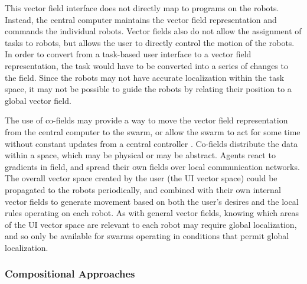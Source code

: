\documentclass[]{article}
\begin{document}
This vector field interface does not directly map to programs on the robots. 
Instead, the central computer maintains the vector field representation and commands the individual robots.
Vector fields also do not allow the assignment of tasks to robots, but allows the user to directly control the motion of the robots. 
In order to convert from a task-based user interface to a vector field representation, the task would have to be converted into a series of changes to the field.
Since the robots may not have accurate localization within the task space, it may not be possible to guide the robots by relating their position to a global vector field. 

The use of co-fields may provide a way to move the vector field representation from the central computer to the swarm, or allow the swarm to act for some time without constant updates from a central controller \cite{mamei2003co}.
Co-fields distribute the data within a space, which may be physical or may be abstract. 
Agents react to gradients in field, and spread their own fields over local communication networks. 
The overall vector space created by the user (the UI vector space) could be propagated to the robots periodically, and combined with their own internal vector fields to generate movement based on both the user's desires and the local rules operating on each robot. 
As with general vector fields, knowing which areas of the UI vector space are relevant to each robot may require global localization, and so only be available for swarms operating in conditions that permit global localization. 

\subsubsection{Compositional Approaches}
\end{document}
